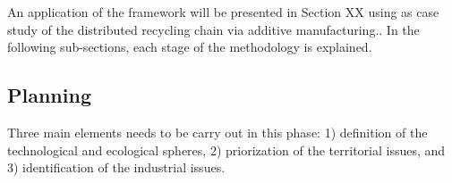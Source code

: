 \documentclass[
  14pt,
]{extarticle}
\begin{document}
An application of the framework will be presented in Section XX using as case study of the distributed recycling chain via additive manufacturing..
In the following sub-sections, each stage of the methodology is explained.

\hypertarget{planning}{%
\subsection{Planning}\label{planning}}

Three main elements needs to be carry out in this phase: 1) definition of the technological and ecological spheres, 2) priorization of the territorial issues, and 3) identification of the industrial issues.

\providecommand{\docline}[3]{\noalign{\global\setlength{\arrayrulewidth}{#1}}\arrayrulecolor[HTML]{#2}\cline{#3}}

\setlength{\tabcolsep}{2pt}

\renewcommand*{\arraystretch}{1.5}
\end{document}
